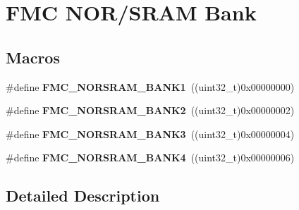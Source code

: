 \hypertarget{group___f_m_c___n_o_r_s_r_a_m___bank}{}\section{F\+MC N\+O\+R/\+S\+R\+AM Bank}
\label{group___f_m_c___n_o_r_s_r_a_m___bank}
\subsection*{Macros}
\begin{DoxyCompactItemize}
\item 
\#define {\bfseries F\+M\+C\+\_\+\+N\+O\+R\+S\+R\+A\+M\+\_\+\+B\+A\+N\+K1}~((uint32\+\_\+t)0x00000000)\hypertarget{group___f_m_c___n_o_r_s_r_a_m___bank_gae21fc4cb32bdf66a091f9b07542128c0}{}\label{group___f_m_c___n_o_r_s_r_a_m___bank_gae21fc4cb32bdf66a091f9b07542128c0}

\item 
\#define {\bfseries F\+M\+C\+\_\+\+N\+O\+R\+S\+R\+A\+M\+\_\+\+B\+A\+N\+K2}~((uint32\+\_\+t)0x00000002)\hypertarget{group___f_m_c___n_o_r_s_r_a_m___bank_ga62300a734aa0e396592f6f7635b634e9}{}\label{group___f_m_c___n_o_r_s_r_a_m___bank_ga62300a734aa0e396592f6f7635b634e9}

\item 
\#define {\bfseries F\+M\+C\+\_\+\+N\+O\+R\+S\+R\+A\+M\+\_\+\+B\+A\+N\+K3}~((uint32\+\_\+t)0x00000004)\hypertarget{group___f_m_c___n_o_r_s_r_a_m___bank_ga6f7b4268d1fd3acb923f92b8907968fe}{}\label{group___f_m_c___n_o_r_s_r_a_m___bank_ga6f7b4268d1fd3acb923f92b8907968fe}

\item 
\#define {\bfseries F\+M\+C\+\_\+\+N\+O\+R\+S\+R\+A\+M\+\_\+\+B\+A\+N\+K4}~((uint32\+\_\+t)0x00000006)\hypertarget{group___f_m_c___n_o_r_s_r_a_m___bank_ga3213b481ce2e43f7cfffc9d903060b97}{}\label{group___f_m_c___n_o_r_s_r_a_m___bank_ga3213b481ce2e43f7cfffc9d903060b97}

\end{DoxyCompactItemize}


\subsection{Detailed Description}
